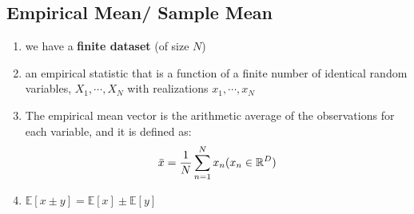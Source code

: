 \subsection{Empirical Mean/ Sample Mean \cite{mfml-1}}
\begin{enumerate}
    \item we have a \textbf{finite dataset} (of size $N$)

    \item an empirical statistic that is a function of a finite number of identical random variables, $X_1, \cdots , X_N$ with realizations $x_1, \cdots , x_N$

    \item The empirical mean vector is the arithmetic average of the observations for each variable, and it is defined as:
    \[
        \bar{x} = \dfrac{1}{N}
        \displaystyle\sum_{n=1}^{N} x_n
        \hfill
        (x_n \in \mathbb{R}^D)
    \]

    \item $\mathbb{E}[x \pm y] = \mathbb{E}[x] \pm \mathbb{E}[y]$
\end{enumerate}






























